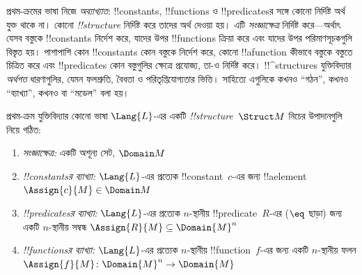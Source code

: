 \documentclass[../../../include/open-logic-section]{subfiles}
\begin{document}


\begin{explain}
প্রথম-ক্রমের ভাষা নিজে \emph{অব্যাখ্যাত}: !!{constant}s,
!!{function}s ও !!{predicate}sর সঙ্গে কোনো নির্দিষ্ট অর্থ যুক্ত থাকে
না। কোনো  \emph{!!{structure}} নির্দিষ্ট করে তাদের
অর্থ দেওয়া হয়। এটি \emph{সংজ্ঞাক্ষেত্র} নির্দিষ্ট করে—অর্থাৎ যেসব
বস্তুকে !!{constant}s নির্দেশ করে, যাদের উপর !!{function}s ক্রিয়া করে
এবং যাদের উপর পরিমাণসূচকগুলি বিস্তৃত হয়। পাশাপাশি কোন !!{constant}s
কোন বস্তুকে নির্দেশ করে, কোনো !!a{function} কীভাবে বস্তুকে বস্তুতে
চিত্রিত করে এবং !!{predicate}s কোন বস্তুগুলির ক্ষেত্রে প্রযোজ্য, তা-ও
নির্দিষ্ট করে। !!^{structure}s যুক্তিবিদ্যার \emph{অর্থগত} ধারণাগুলির,
যেমন ফলশ্রুতি, বৈধতা ও পরিতৃপ্তিযোগ্যতার ভিত্তি। সাহিত্যে এগুলিকে কখনও
“গঠন”, কখনও “ব্যাখ্যা”, কখনও বা “মডেল” বলা হয়।
\end{explain}

\begin{defn}[!!^{structure}s]
প্রথম-ক্রম যুক্তিবিদ্যার কোনো ভাষা $\Lang{L}$-এর একটি
 \emph{!!{structure}}~$\Struct M$ নিচের উপাদানগুলি
নিয়ে গঠিত:
\begin{enumerate}
\item \emph{সংজ্ঞাক্ষেত্র:} একটি অশূন্য সেট, $\Domain M$
\item \emph{!!{constant}sর ব্যাখ্যা:} $\Lang{L}$-এর প্রত্যেক
  !!{constant}~$c$-এর জন্য !!a{element} $\Assign{c}{M} \in \Domain M$
\item \emph{!!{predicate}sর ব্যাখ্যা:} $\Lang{L}$-এর প্রত্যেক
  $n$-স্থানীয় !!{predicate}~$R$-এর ($\eq$ ছাড়া) জন্য একটি
  $n$-স্থানীয় সম্বন্ধ $\Assign{R}{M} \subseteq \Domain{M}^n$
\item \emph{!!{function}sর ব্যাখ্যা:} $\Lang{L}$-এর প্রত্যেক
  $n$-স্থানীয় !!{function}~$f$-এর জন্য একটি $n$-স্থানীয় ফলন
  $\Assign{f}{M} \colon \Domain{M}^n \to \Domain{M}$
\end{enumerate}
\end{defn}
\end{document}
